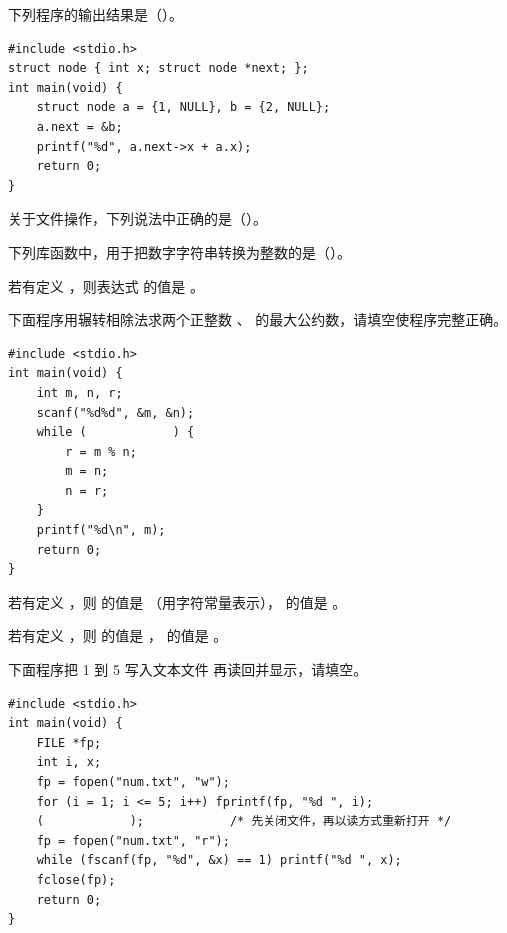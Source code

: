 \documentclass[a4paper,11pt]{article}
\begin{document}
\begin{qgroup}
\q 下列程序的输出结果是（\quad）。
\begin{lstlisting}[language={[custom]C}]
#include <stdio.h>
struct node { int x; struct node *next; };
int main(void) {
    struct node a = {1, NULL}, b = {2, NULL};
    a.next = &b;
    printf("%d", a.next->x + a.x);
    return 0;
}
\end{lstlisting}

\q 关于文件操作，下列说法中正确的是（\quad）。

\q 下列库函数中，用于把数字字符串转换为整数的是（\quad）。
\end{qgroup}

\begin{qgroup}
\q 若有定义 ，则表达式  的值是 \fillblank{}。

\q 下面程序用辗转相除法求两个正整数 、 的最大公约数，请填空使程序完整正确。
\begin{lstlisting}[language={[custom]C}]
#include <stdio.h>
int main(void) {
    int m, n, r;
    scanf("%d%d", &m, &n);
    while (            ) {
        r = m % n;
        m = n;
        n = r;
    }
    printf("%d\n", m);
    return 0;
}
\end{lstlisting}

\q 若有定义 ，则  的值是 \fillblank{}（用字符常量表示）， 的值是 \fillblank{}。

\q 若有定义 ，则  的值是 \fillblank{}， 的值是 \fillblank{}。

\q 下面程序把 1 到 5 写入文本文件  再读回并显示，请填空。
\begin{lstlisting}[language={[custom]C}]
#include <stdio.h>
int main(void) {
    FILE *fp;
    int i, x;
    fp = fopen("num.txt", "w");
    for (i = 1; i <= 5; i++) fprintf(fp, "%d ", i);
    (            );            /* 先关闭文件，再以读方式重新打开 */
    fp = fopen("num.txt", "r");
    while (fscanf(fp, "%d", &x) == 1) printf("%d ", x);
    fclose(fp);
    return 0;
}
\end{lstlisting}
\end{qgroup}
\end{document}
